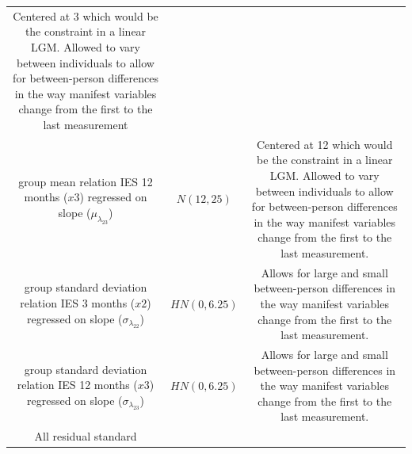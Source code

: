 \documentclass[openright,titlepage,12pt,a4paper]{book}
\begin{document}
\begin{longtable}[]{@{}ccc@{}}
\begin{minipage}[t]{0.45\columnwidth}
Centered at 3 which would be the
constraint in a linear LGM.
Allowed to vary between individuals
to allow for between-person
differences in the way manifest
variables change from the first
to the last measurement\strut
\end{minipage}\tabularnewline
\begin{minipage}[t]{0.29\columnwidth}\centering
group mean relation
IES 12 months (\(x3\))
regressed on slope
(\(\mu_{\lambda_{23}}\))\strut
\end{minipage} & \begin{minipage}[t]{0.16\columnwidth}\centering
\(N(12, 25)\)\strut
\end{minipage} & \begin{minipage}[t]{0.45\columnwidth}\centering
Centered at 12 which would be the
constraint in a linear LGM.
Allowed to vary between individuals
to allow for between-person
differences in the way manifest
variables change from the first
to the last measurement.\strut
\end{minipage}\tabularnewline
\begin{minipage}[t]{0.29\columnwidth}\centering
group standard deviation
relation IES 3 months
(\(x2\)) regressed on slope
(\(\sigma_{\lambda_{22}}\))\strut
\end{minipage} & \begin{minipage}[t]{0.16\columnwidth}\centering
\(HN(0, 6.25)\)\strut
\end{minipage} & \begin{minipage}[t]{0.45\columnwidth}\centering
Allows for large and small
between-person differences in the
way manifest variables change from
the first to the last measurement.\strut
\end{minipage}\tabularnewline
\begin{minipage}[t]{0.29\columnwidth}\centering
group standard deviation
relation IES 12 months
(\(x3\)) regressed on slope
(\(\sigma_{\lambda_{23}}\))\strut
\end{minipage} & \begin{minipage}[t]{0.16\columnwidth}\centering
\(HN(0, 6.25)\)\strut
\end{minipage} & \begin{minipage}[t]{0.45\columnwidth}\centering
Allows for large and small
between-person differences in the
way manifest variables change from
the first to the last measurement.\strut
\end{minipage}\tabularnewline
\begin{minipage}[t]{0.29\columnwidth}\centering
All residual standard

\end{minipage}
\end{longtable}
\end{document}
